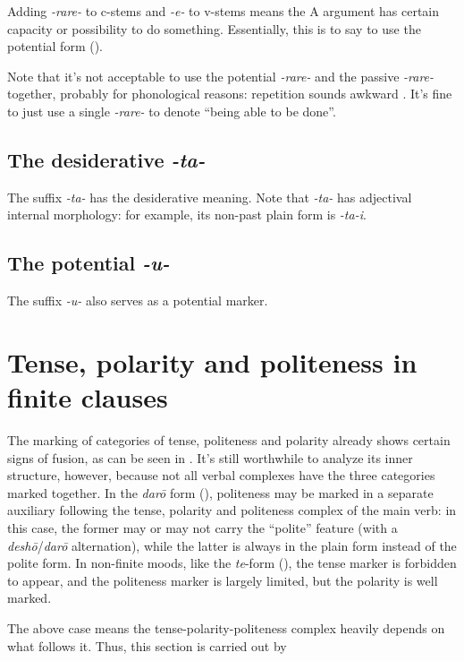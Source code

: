 \documentclass[UTF8, a4paper, oneside, scheme=plain]{ctexrep}
\newcommand{\corpus}[1]{\emph{#1}}
\begin{document}
Adding \corpus{-rare-} to c-stems and \corpus{-e-} to v-stems 
means the A argument has certain capacity or possibility to do something.
Essentially, this is to say to use the potential form ().

Note that it's not acceptable to use the potential \corpus{-rare-} and the passive \corpus{-rare-} together,
probably for phonological reasons: repetition sounds awkward \citep{kuno1978japanese}.
It's fine to just use a single \corpus{-rare-} to denote ``being able to be done''.

\subsection{The desiderative \corpus{-ta-}}

The suffix \corpus{-ta-} has the desiderative meaning.
Note that \corpus{-ta-} has adjectival internal morphology:
for example, its non-past plain form is \corpus{-ta-i}.

\subsection{The potential \corpus{-u-}}

The suffix \corpus{-u-} also serves as a potential marker.

\section{Tense, polarity and politeness in finite clauses}\label{sec:tense-polarity-polite}

The marking of categories of tense, politeness and polarity 
already shows certain signs of fusion,
as can be seen in .
It's still worthwhile to analyze its inner structure, however,
because not all verbal complexes have the three categories marked together.
In the \corpus{dar\={o}} form (),
politeness may be marked in a separate auxiliary following 
the tense, polarity and politeness complex of the main verb:
in this case, the former may or may not carry the ``polite'' feature
(with a \corpus{desh\={o}}/\corpus{dar\={o}} alternation),
while the latter is always in the plain form instead of the polite form.
In non-finite moods, like the \corpus{te}-form (), 
the tense marker is forbidden to appear,
and the politeness marker is largely limited,
but the polarity is well marked.

The above case means the tense-polarity-politeness complex heavily depends on what follows it.
Thus, this section is carried out by 
\end{document}
